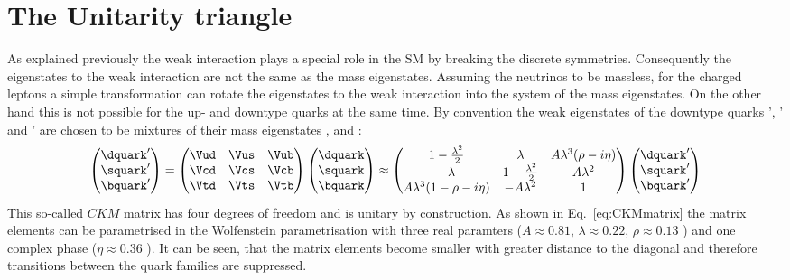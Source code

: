 \section{The Unitarity triangle}
\label{sec:unitarityTriangle}

As explained previously the weak interaction plays a special role in the \ac{SM} by breaking the discrete symmetries. Consequently
the eigenstates to the weak interaction are not the same as the mass eigenstates. Assuming the neutrinos to be massless, for the
charged leptons a simple transformation can rotate the eigenstates to the weak interaction into the system of the mass eigenstates.
On the other hand this is not possible for the up- and downtype quarks at the same time. By convention the weak eigenstates of the
downtype quarks \dquark', \squark' and \bquark' are chosen to be mixtures of their mass eigenstates \dquark, \squark and \bquark:
\begin{equation}
\begin{pmatrix} \dquark' \\ \squark' \\ \bquark' \end{pmatrix}
= \begin{pmatrix} \Vud & \Vus & \Vub \\ \Vcd & \Vcs & \Vcb \\ \Vtd & \Vts & \Vtb \end{pmatrix}
\begin{pmatrix} \dquark \\ \squark \\ \bquark \end{pmatrix}
\approx \begin{pmatrix} 1-\frac{\lambda^2}{2} & \lambda & A\lambda^3(\rho-i\eta) \\
                        -\lambda & 1-\frac{\lambda^2}{2} & A\lambda^2 \\
                        A\lambda^3(1-\rho-i\eta) & -A\lambda^2 & 1 \end{pmatrix}
\begin{pmatrix} \dquark' \\ \squark' \\ \bquark' \end{pmatrix} \label{eq:CKMmatrix}
\end{equation}
This so-called $CKM$ matrix has four degrees of freedom and is unitary by construction. As shown in Eq.~\cref{eq:CKMmatrix}
the matrix elements can be parametrised in the Wolfenstein parametrisation with three real paramters ($A\approx0.81$,
$\lambda\approx0.22$, $\rho\approx0.13$ \cite{PDG_2017}) and one complex phase ($\eta\approx0.36$ \cite{PDG_2017}).
It can be seen, that the matrix elements become smaller with greater distance to the diagonal and therefore transitions between
the quark families are suppressed.

